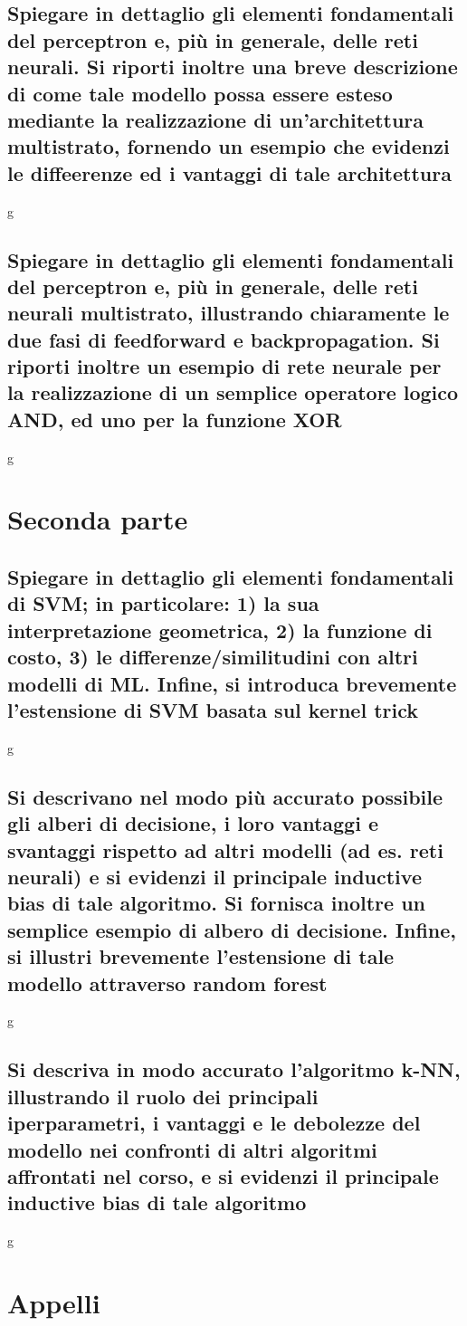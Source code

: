 \documentclass[10pt,oneside,a4paper]{article}
\begin{document}
\subsection{Spiegare in dettaglio gli elementi fondamentali del perceptron e, più in generale, delle reti
	neurali. Si riporti inoltre una breve descrizione di come tale modello possa essere esteso
	mediante la realizzazione di un’architettura multistrato, fornendo un esempio che evidenzi
	le diffeerenze ed i vantaggi di tale architettura}
g
\subsection{Spiegare in dettaglio gli elementi fondamentali del perceptron e, più in generale, delle reti
	neurali multistrato, illustrando chiaramente le due fasi di feedforward e backpropagation.
	Si riporti inoltre un esempio di rete neurale per la realizzazione di un semplice operatore
	logico AND, ed uno per la funzione XOR}
g
\section{Seconda parte}
\subsection{Spiegare in dettaglio gli elementi fondamentali di SVM; in particolare: 1) la sua interpretazione geometrica, 2) la funzione di costo, 3) le differenze/similitudini con altri modelli di ML. Infine, si introduca brevemente l’estensione di SVM basata sul kernel trick}
g
\subsection{Si descrivano nel modo più accurato possibile gli alberi di decisione, i loro vantaggi e svantaggi rispetto ad altri modelli (ad es. reti neurali) e si evidenzi il principale inductive bias di tale algoritmo. Si fornisca inoltre un semplice esempio di albero di decisione. Infine, si illustri brevemente l’estensione di tale modello attraverso random forest}
g
\subsection{Si descriva in modo accurato l’algoritmo k-NN, illustrando il ruolo dei principali iperparametri, i vantaggi e le debolezze del modello nei confronti di altri algoritmi affrontati nel corso, e si evidenzi il principale inductive bias di tale algoritmo}
g
\section{Appelli}
\end{document}
